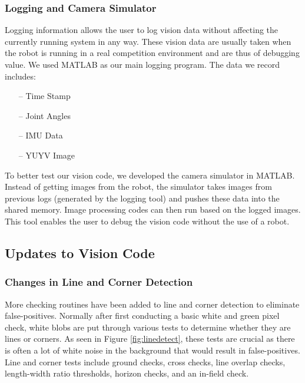 \documentclass{article}
\begin{document}
    \subsubsection{Logging and Camera Simulator}
      Logging information allows the user to log vision data without affecting the currently running system in any way. These vision data are usually taken when the robot is running in a real competition environment and are thus of debugging value. We used MATLAB as our main logging program. The data we record includes:
      \begin{itemize}
        \item[--] Time Stamp
        \item[--] Joint Angles
        \item[--] IMU Data
        \item[--] YUYV Image
      \end{itemize}
  
      To better test our vision code, we developed the camera simulator in MATLAB. Instead of getting images from the robot, the simulator takes images from previous logs (generated by the logging tool) and pushes these data into the shared memory. Image processing codes can then run based on the logged images. This tool enables the user to debug the vision code without the use of a robot.


  \subsection{Updates to Vision Code}
	  \subsubsection{Changes in Line and Corner Detection}
	    More checking routines have been added to line and corner detection to eliminate false-positives. Normally after first conducting a basic white and green pixel check, white blobs are put through various tests to determine whether they are lines or corners. As seen in Figure \ref{fig:linedetect}, these tests are crucial as there is often a lot of white noise in the background that would result in false-positives. Line and corner tests include ground checks, cross checks, line overlap checks, length-width ratio thresholds, horizon checks, and an in-field check. 
\end{document}
